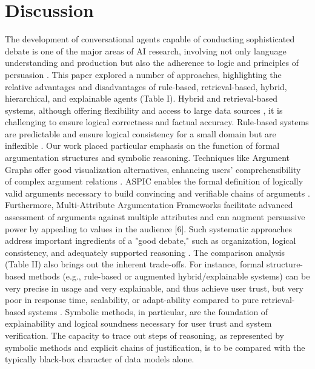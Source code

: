 \documentclass[conference]{IEEEtran}
\begin{document}
\section{Discussion}
The development of conversational agents capable of conducting sophisticated debate is one of the major areas of AI research, involving not only language understanding and production but also the adherence to logic and principles of persuasion \cite{rakshit2019debbie}. This paper explored a number of approaches, highlighting the relative advantages and disadvantages of rule-based, retrieval-based, hybrid, hierarchical, and explainable agents (Table I). Hybrid and retrieval-based systems, although offering flexibility and access to large data sources \cite{kulatska2019arguebot}, it is challenging to ensure logical correctness and factual accuracy. Rule-based systems are predictable and ensure logical consistency for a small domain but are inflexible \cite{montealto2021rulebased}.
Our work placed particular emphasis on the function of formal argumentation structures and symbolic reasoning. Techniques like Argument Graphs offer good visualization alternatives, enhancing users' comprehensibility of complex argument relations \cite{chalaguine2020persuasive}\cite{engelmann2022argumentation}. ASPIC enables the formal definition of logically valid arguments necessary to build convincing and verifiable chains of arguments \cite{engelmann2022argumentation}. Furthermore, Multi-Attribute Argumentation Frameworks facilitate advanced assessment of arguments against multiple attributes and can augment persuasive power by appealing to values in the audience [6]. Such systematic approaches address important ingredients of a "good debate," such as organization, logical consistency, and adequately supported reasoning \cite{debatingforeveryone2025judge}\cite{shuster2025judging}.
The comparison analysis (Table II) also brings out the inherent trade-offs. For instance, formal structure-based methods (e.g., rule-based or augmented hybrid/explainable systems) can be very precise in usage and very explainable, and thus achieve user trust, but very poor in response time, scalability, or adapt-ability compared to pure retrieval-based systems \cite{smythos2025performance}. Symbolic methods, in particular, are the foundation of explainability and logical soundness necessary for user trust and system verification. The capacity to trace out steps of reasoning, as represented by symbolic methods and explicit chains of justification, is to be compared with the typically black-box character of data models alone.
\end{document}
